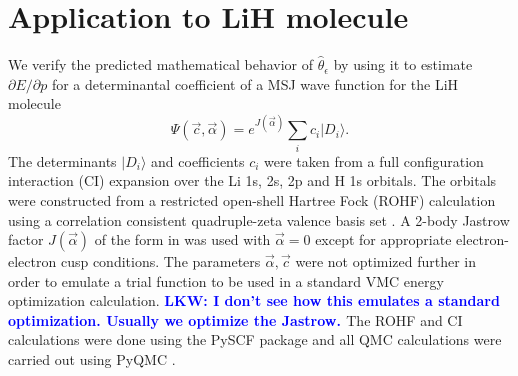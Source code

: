 \documentclass[twocolumn]{revtex4-1}
\newcommand{\lucas}[1]{\textbf{\textcolor{blue}{LKW: #1}}}
\begin{document}
\section{Application to LiH molecule}
We verify the predicted mathematical behavior of $\hat{\theta}_\epsilon$ by using it to estimate $\partial E/\partial p$ for a determinantal coefficient of a MSJ wave function for the LiH molecule
\begin{equation}
\Psi(\vec{c}, \vec{\alpha}) = e^{J(\vec{\alpha})} \sum_{i} c_i  |D_i \rangle.
\end{equation}
The determinants $|D_i \rangle$ and coefficients $c_i$ were taken from a full configuration interaction (CI) expansion over the Li 1s, 2s, 2p and H 1s orbitals.
The orbitals were constructed from a restricted open-shell Hartree Fock (ROHF) calculation using a correlation consistent quadruple-zeta valence basis set \cite{doi:10.1063/1.456153}.
A 2-body Jastrow factor $J(\vec{\alpha})$ of the form in \cite{Wagner2009} was used with $\vec{\alpha} = 0$ except for appropriate electron-electron cusp conditions.
The parameters $\vec{\alpha}, \vec{c}$ were not optimized further in order to emulate a trial function to be used in a standard VMC energy optimization calculation.
\lucas{I don't see how this emulates a standard optimization. Usually we optimize the Jastrow. } 
The ROHF and CI calculations were done using the PySCF package \cite{PYSCF} and all QMC calculations were carried out using PyQMC \cite{pyqmc}.
\end{document}
